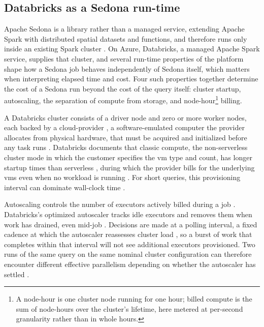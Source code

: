 \subsection{Databricks as a Sedona run-time}
\label{background:distributed-spatial-processing:databricks-as-a-sedona-run-time}
Apache Sedona is a library rather than a managed service, extending Apache Spark with distributed spatial datasets and functions, and therefore runs only inside an existing Spark cluster \parencite{sedona2026_sedonaspark}. On Azure, Databricks, a managed Apache Spark service, supplies that cluster, and several run-time properties of the platform shape how a Sedona job behaves independently of Sedona itself, which matters when interpreting elapsed time and cost. Four such properties together determine the cost of a Sedona run beyond the cost of the query itself: cluster startup, autoscaling, the separation of compute from storage, and node-hour\footnote{A node-hour is one cluster node running for one hour; billed compute is the sum of node-hours over the cluster's lifetime, here metered at per-second granularity rather than in whole hours.} billing.

A Databricks cluster consists of a driver node and zero or more worker nodes, each backed by a cloud-provider , a software-emulated computer the provider allocates from physical hardware, that must be acquired and initialized before any task runs \parencite{databricks2024_compute_configuration}. Databricks documents that classic compute, the non-serverless cluster mode in which the customer specifies the \acrshort{vm} type and count, has longer startup times than serverless \parencite{databricks2024_cost_optimization_best_practices}, during which the provider bills for the underlying \acrshort{vm}s even when no workload is running \parencite{databricks2024_pool_index}. For short queries, this provisioning interval can dominate wall-clock time \parencite{databricks2024_cost_optimization_best_practices}.

Autoscaling controls the number of executors actively billed during a job \parencite{databricks2024_compute_configuration}. Databricks's optimized autoscaler tracks idle executors and removes them when work has drained, even mid-job \parencite{databricks2018_optimized_autoscaling}. Decisions are made at a polling interval, a fixed cadence at which the autoscaler reassesses cluster load \parencite{databricks2024_compute_configuration}, so a burst of work that completes within that interval will not see additional executors provisioned. Two runs of the same query on the same nominal cluster configuration can therefore encounter different effective parallelism depending on whether the autoscaler has settled \parencite{databricks2018_optimized_autoscaling, databricks2024_compute_configuration}.

